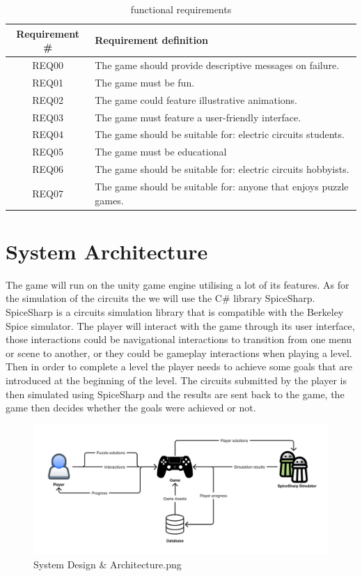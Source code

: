 \documentclass[../main.tex]{subfiles}
\begin{document}
\begin{table}[!ht]
    \caption{functional requirements}  
    \centering
    \begin{tabular}{|c|l|}
       \hline
       Requirement \# & Requirement definition\\
\hline
REQ00 & The game should provide descriptive messages on failure. \\
\hline
REQ01 & The game must be fun. \\
\hline
REQ02 & The game could feature illustrative animations. \\
\hline
REQ03 & The game must feature a user-friendly interface.\\
\hline
REQ04 & The game should be suitable for: electric circuits students. \\
\hline
REQ05 & The game must be educational
\\
\hline
REQ06 & The game should be suitable for: electric circuits hobbyists.\\
\hline
REQ07 & The game should be suitable for: anyone that enjoys puzzle games.\\

       \hline
       \end{tabular}
    \label{non_functional}
\end{table}
\newpage
\section{System Architecture}

The game will run on the unity game engine utilising a lot of its features. As for the simulation of the circuits the we will use the C\# library SpiceSharp. SpiceSharp is a circuits simulation library that is compatible with the Berkeley Spice simulator. The player will interact with the game through its user interface, those interactions could be navigational interactions to transition from one menu or scene to another, or they could be gameplay interactions when playing a level. Then in order to complete a level the player needs to achieve some goals that are introduced at the beginning of the level. The circuits submitted by the player is then simulated using SpiceSharp and the results are sent back to the game, the game then decides whether the goals were achieved or not.
\begin{figure}[ht]
\centering
\includegraphics[scale=0.14]{images/chapter3/System Design & Architecture.png}
\caption{System Design \& Architecture.png}
\label{System Design and  Architecture.png}
\end{figure}
\end{document}
